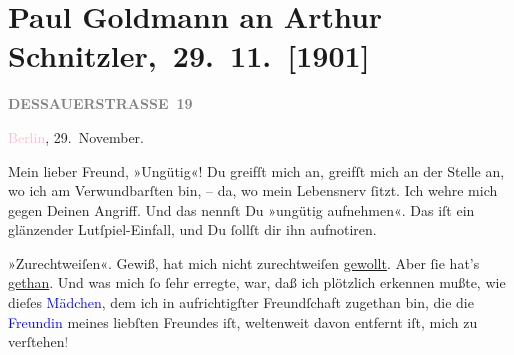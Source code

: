 

\renewcommand{\erwaehntePersonen}{Personen: Gerhart Hauptmann, Olga Schnitzler, Ernst von Wolzogen}
\renewcommand{\erwaehnteInstitutionen}{Institutionen: Überbrettl}
\renewcommand{\erwaehnteOrte}{Orte: Berlin, Dessauer Straße, Deutsches Theater Berlin, Wien}
\renewcommand{\erwaehnteWerke}{Werke: Der rothe Hahn. Tragikomödie in vier Akten}
\section[ Paul Goldmann an Arthur Schnitzler, 29. 11. {[}1901{]}]{Paul Goldmann an Arthur Schnitzler, 29. 11. {[}1901{]}}
\nopagebreak{}
\rehead{ }\normalsize\beginnumbering{}
\toendnotes[C]{\smallbreak\pagebreak[2]}
\toendnotes[C]{\smallbreak}
\pstart
           \noindent{}\raggedleft{}{\pb}\textcolor{pink}{\textcolor{gray}{\textbf{DESSAUERSTRASSE 19}}}{}\ledrightnote{\textcolor{pink}{Dessauer Straße}}\pend
           
\pstart
           \textcolor{pink}{Berlin}{}\ledrightnote{\textcolor{pink}{Berlin}}, 29. November.\pend
           
\pstart\center{}Mein lieber Freund,\pend
\pstart
           »Ungütig«! Du greifſt mich an, greifſt mich an der Stelle an, wo ich am
               Verwundbarſten bin, – da, wo mein Lebensnerv ſitzt. Ich wehre mich gegen Deinen
               Angriff. Und das nennſt Du »ungütig aufnehmen«. Das iſt ein glänzender
               Lutſpiel-Einfall, und Du ſollſt dir ihn aufnotiren.\pend
           
\pstart
           »Zurechtweiſen«. Gewiß, \label{K_L03092-1v}\label{K_L03092-1h} hat mich nicht zurechtweiſen {\pb}\uline{gewollt}. Aber ſie hat’s \uline{gethan}. Und was mich ſo ſehr erregte, 
               war, daß ich plötzlich erkennen mußte, wie dieſes \textcolor{blue}{Mädchen}{}\ledrightnote{{$\rightarrow$}\textcolor{blue}{Olga Schnitzler}}, dem ich in aufrichtigſter Freundſchaft zugethan
               bin, die die \textcolor{blue}{Freundin}{}\ledrightnote{{$\rightarrow$}\textcolor{blue}{Olga Schnitzler}} meines
               liebſten Freundes iſt, weltenweit davon entfernt iſt, mich zu
                  verſtehen\textcolor{gray}{!}\pend
           
